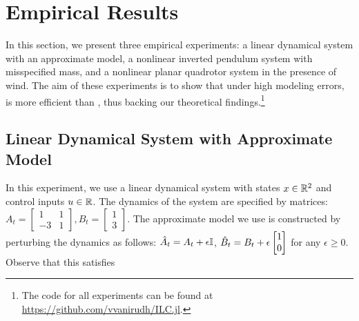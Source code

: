 \section{Empirical Results}
\label{sec:empirical-results}

In this section, we present three empirical
experiments: a linear dynamical system with an approximate model, a
nonlinear inverted pendulum system with misspecified mass, and a nonlinear planar
quadrotor system in the presence of wind. The aim of these
experiments is to show that under high modeling errors, \ILC{} is
more efficient than \MM{}, thus backing our theoretical findings.\footnote{The
  code for all experiments can be found at
\url{https://github.com/vvanirudh/ILC.jl}.}

\subsection{Linear Dynamical System with Approximate Model}
\label{sec:line-dynam-syst}
In this experiment, we use a linear dynamical system with states
$x \in \mathbb{R}^{2}$ and control inputs $u \in \mathbb{R}$.
The dynamics of the system
are specified by matrices:
$A_{t} =
      \begin{bmatrix}
        1 & 1 \\
        -3 & 1
      \end{bmatrix},
  B_{t} =
          \begin{bmatrix}
            1 \\
            3
          \end{bmatrix}$.
The approximate model we use is constructed by perturbing the dynamics as
follows: $\hat{A}_t = A_t + \epsilon\mathbb{I}$, $\hat{B}_t = B_t +
\epsilon\begin{bmatrix}1 \\ 0\end{bmatrix}$
for any $\epsilon \geq 0$. Observe that this satisfies
